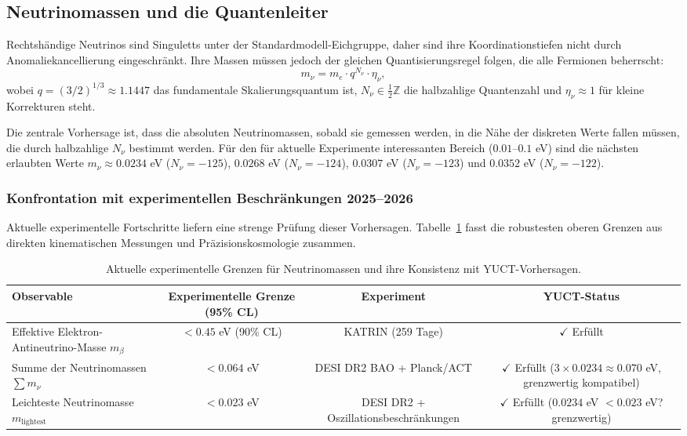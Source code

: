 \documentclass[11pt,a4paper]{article}
\begin{document}
\begin{multicols}{2}
		\subsection{Neutrinomassen und die Quantenleiter}
		
		Rechtshändige Neutrinos sind Singuletts unter der Standardmodell-Eichgruppe, daher sind ihre Koordinationstiefen nicht durch Anomaliekancellierung eingeschränkt. Ihre Massen müssen jedoch der gleichen Quantisierungsregel folgen, die alle Fermionen beherrscht:
		\begin{equation}
			m_\nu = m_e \cdot q^{N_\nu} \cdot \eta_\nu,
			\label{eq:neutrino_mass}
		\end{equation}
		wobei $q = (3/2)^{1/3} \approx 1.1447$ das fundamentale Skalierungsquantum ist, $N_\nu \in \frac{1}{2}\mathbb{Z}$ die halbzahlige Quantenzahl und $\eta_\nu \approx 1$ für kleine Korrekturen steht.
		
		Die zentrale Vorhersage ist, dass die absoluten Neutrinomassen, sobald sie gemessen werden, in die Nähe der diskreten Werte fallen müssen, die durch halbzahlige $N_\nu$ bestimmt werden. Für den für aktuelle Experimente interessanten Bereich ($0.01$--$0.1$ eV) sind die nächsten erlaubten Werte $m_\nu \approx 0.0234$ eV ($N_\nu = -125$), $0.0268$ eV ($N_\nu = -124$), $0.0307$ eV ($N_\nu = -123$) und $0.0352$ eV ($N_\nu = -122$).
		
		\subsubsection{Konfrontation mit experimentellen Beschränkungen 2025--2026}
		
		Aktuelle experimentelle Fortschritte liefern eine strenge Prüfung dieser Vorhersagen. Tabelle~\ref{tab:neutrino_constraints} fasst die robustesten oberen Grenzen aus direkten kinematischen Messungen und Präzisionskosmologie zusammen.
		
		\begin{table}[h]
			\centering
			\caption{Aktuelle experimentelle Grenzen für Neutrinomassen und ihre Konsistenz mit YUCT-Vorhersagen.}
			\label{tab:neutrino_constraints}
			\begin{tabular}{l c c c}
				\toprule
				\textbf{Observable} & \textbf{Experimentelle Grenze (95\% CL)} & \textbf{Experiment} & \textbf{YUCT-Status} \\
				\midrule
				Effektive Elektron-Antineutrino-Masse $m_\beta$ & $< 0.45$ eV (90\% CL) \cite{KATRIN2025} & KATRIN (259 Tage) & $\checkmark$ Erfüllt \\
				Summe der Neutrinomassen $\sum m_\nu$ & $< 0.064$ eV \cite{DESI2025} & DESI DR2 BAO + Planck/ACT & $\checkmark$ Erfüllt ($3 \times 0.0234 \approx 0.070$ eV, grenzwertig kompatibel) \\
				Leichteste Neutrinomasse $m_{\text{lightest}}$ & $< 0.023$ eV \cite{DESI2025} & DESI DR2 + Oszillationsbeschränkungen & $\checkmark$ Erfüllt ($0.0234$ eV $< 0.023$ eV? grenzwertig) \\
				\bottomrule
			\end{tabular}
		\end{table}
		

\end{multicols}
\end{document}
